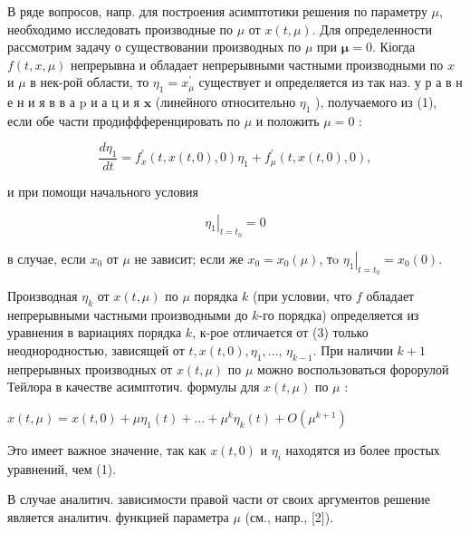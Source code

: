 \documentclass[10pt]{article}
\begin{document}
В ряде вопросов, напр. для построения асимптотики решения по параметру $\mu$, необходимо исследовать производные по $\mu$ от $x(t, \mu)$. Для определенности рассмотрим задачу о существовании производных по $\mu$ при $\boldsymbol{\mu}=0$. Кіогда $f(t, x, \mu)$ непрерывна и обладает непрерывными частными производными по $x$ и $\mu$ в нек-рой области, то $\eta_{1}=x_{\mu}^{\prime}$ существует и определяется из так наз. у р а в н е н и я в в а $\mathrm{p}$ и а ц и я $\mathbf{x}$ (линейного относительно $\eta_{1}$ ), получаемого из (1), если обе части продиффференцировать по $\mu$ и положить $\mu=0$ :



\[

\frac{d \eta_{1}}{d t}=f_{x}^{\prime}(t, x(t, 0), 0) \eta_{1}+f_{\mu}^{\prime}(t, x(t, 0), 0),

\]



и при помощи начального условия



\[

\left.\eta_{1}\right|_{t=t_{0}}=0

\]



в случае, если $x_{0}$ от $\mu$ не зависит; если же $x_{0}=x_{0}(\mu)$, тo $\left.\eta_{1}\right|_{t=t_{0}}=x_{0}(0)$.



Производная $\eta_{k}$ от $x(t, \mu)$ по $\mu$ порядка $k$ (при условии, что $f$ обладает непрерывными частными производными до $k$-го порядка) определяется из уравнения в вариациях порядка $k$, к-рое отличается от (3) только неоднородностью, зависящей от $t, x(t, 0), \eta_{1}, \ldots$, $\eta_{k-1}$. При наличии $k+1$ непрерывных производных от $x(t, \mu)$ по $\mu$ можно воспользоваться форорулой Тейлора в качестве асимптотич. формулы для $x(t, \mu)$ по $\mu$ :



$x(t, \mu)=x(t, 0)+\mu \eta_{1}(t)+\ldots+\mu^{k} \eta_{k}(t)+O\left(\mu^{k+1}\right)$



Это имеет важное значение, так как $x(t, 0)$ и $\eta_{i}$ находятся из более простых уравнений, чем (1).



В случае аналитич. зависимости правой части от своих аргументов решение является аналитич. функцией параметра $\mu$ (см., напр., [2]).
\end{document}
